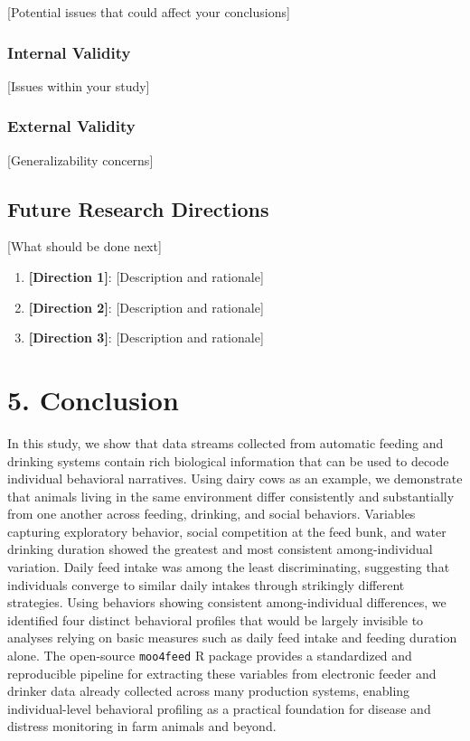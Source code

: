 \documentclass[
]{article}
\providecommand{\tightlist}{%
  \setlength{\itemsep}{0pt}\setlength{\parskip}{0pt}}
\begin{document}
{[}Potential issues that could affect your conclusions{]}

\subsubsection{Internal Validity}\label{internal-validity}

{[}Issues within your study{]}

\subsubsection{External Validity}\label{external-validity}

{[}Generalizability concerns{]}

\subsection{Future Research
Directions}\label{future-research-directions}

{[}What should be done next{]}

\begin{enumerate}
\def\labelenumi{\arabic{enumi}.}
\tightlist
\item
  \textbf{{[}Direction 1{]}}: {[}Description and rationale{]}
\item
  \textbf{{[}Direction 2{]}}: {[}Description and rationale{]}
\item
  \textbf{{[}Direction 3{]}}: {[}Description and rationale{]}
\end{enumerate}

\section{5. Conclusion}\label{conclusion}

In this study, we show that data streams collected from automatic
feeding and drinking systems contain rich biological information that
can be used to decode individual behavioral narratives. Using dairy cows
as an example, we demonstrate that animals living in the same
environment differ consistently and substantially from one another
across feeding, drinking, and social behaviors. Variables capturing
exploratory behavior, social competition at the feed bunk, and water
drinking duration showed the greatest and most consistent
among-individual variation. Daily feed intake was among the least
discriminating, suggesting that individuals converge to similar daily
intakes through strikingly different strategies. Using behaviors showing
consistent among-individual differences, we identified four distinct
behavioral profiles that would be largely invisible to analyses relying
on basic measures such as daily feed intake and feeding duration alone.
The open-source \texttt{moo4feed} R package provides a standardized and
reproducible pipeline for extracting these variables from electronic
feeder and drinker data already collected across many production
systems, enabling individual-level behavioral profiling as a practical
foundation for disease and distress monitoring in farm animals and
beyond.
\end{document}
